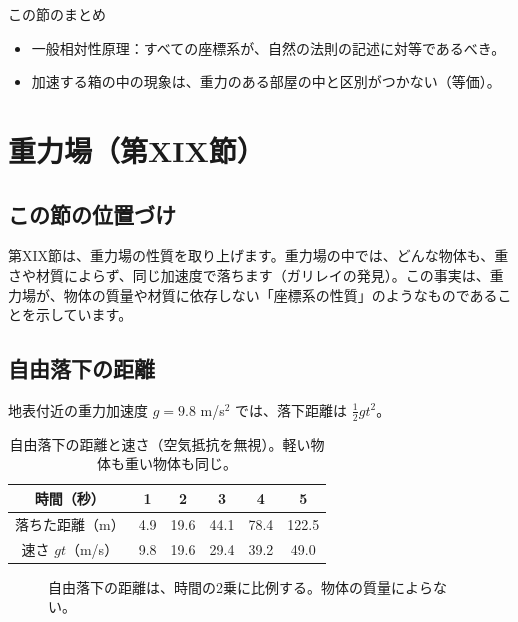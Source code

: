 \documentclass[a4paper,11pt,openany]{ltjsbook}
\begin{document}
\begin{pointbox}{この節のまとめ}
\begin{itemize}[leftmargin=*]
\item 一般相対性原理：すべての座標系が、自然の法則の記述に対等であるべき。
\item 加速する箱の中の現象は、重力のある部屋の中と区別がつかない（等価）。
\end{itemize}
\end{pointbox}

\chapter{重力場（第XIX節）}

\section{この節の位置づけ}

第XIX節は、重力場の性質を取り上げます。重力場の中では、どんな物体も、重さや材質によらず、同じ加速度で落ちます（ガリレイの発見）。この事実は、重力場が、物体の質量や材質に依存しない「座標系の性質」のようなものであることを示しています。

\section{自由落下の距離}

地表付近の重力加速度 $g=9.8$ m/s$^2$ では、落下距離は $\tfrac12gt^2$。

\begin{table}[htbp]
\centering
\begin{tabular}{c|ccccc}
\toprule
時間（秒） & 1 & 2 & 3 & 4 & 5\\
\midrule
落ちた距離（m） & 4.9 & 19.6 & 44.1 & 78.4 & 122.5\\
速さ $gt$（m/s） & 9.8 & 19.6 & 29.4 & 39.2 & 49.0\\
\bottomrule
\end{tabular}
\caption{自由落下の距離と速さ（空気抵抗を無視）。軽い物体も重い物体も同じ。}
\end{table}

\begin{figure}[htbp]
\centering
{}
\caption{自由落下の距離は、時間の2乗に比例する。物体の質量によらない。}
\end{figure}
\end{document}

